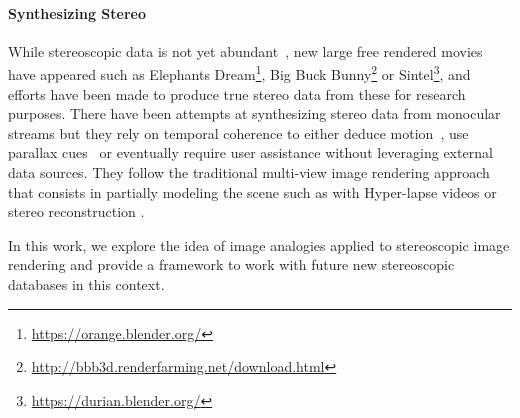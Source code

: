 \paragraph{Synthesizing Stereo}
While stereoscopic data is not yet abundant~\cite{Corrigan10, Smolic10}, 
new large free rendered movies have appeared such as Elephants Dream\footnote{\url{https://orange.blender.org/}}, 
Big Buck Bunny\footnote{\url{http://bbb3d.renderfarming.net/download.html}} or 
Sintel\footnote{\url{https://durian.blender.org/}}, and efforts have been made to produce true stereo data from these for research purposes.
There have been attempts at synthesizing stereo data from monocular streams but they rely on temporal coherence to either deduce motion~\cite{Moustakas05}, use parallax cues~\cite{Zhang07} or eventually require user assistance \cite{Wang11} without leveraging external data sources.
They follow the traditional multi-view image rendering approach that consists in partially modeling the scene such as with Hyper-lapse videos \cite{Kopf14} or stereo reconstruction \cite{Seitz06}.

In this work, we explore the idea of image analogies applied to stereoscopic image rendering and provide a framework to work with future new stereoscopic databases in this context.